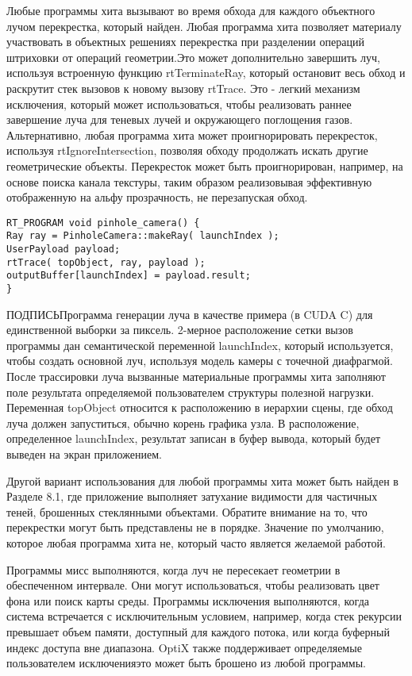 Любые программы хита вызывают во время обхода для каждого объектного лучом перекрестка, который найден. Любая программа хита позволяет материалу участвовать в объектных решениях перекрестка при разделении операций штриховки от операций геометрии.Это может дополнительно завершить луч, используя встроенную функцию rtTerminateRay, который остановит весь обход и раскрутит стек вызовов к новому вызову rtTrace. Это - легкий механизм исключения, который может использоваться, чтобы реализовать раннее завершение луча для теневых лучей и окружающего поглощения газов. Альтернативно, любая программа хита может проигнорировать перекресток, используя rtIgnoreIntersection, позволяя обходу продолжать искать другие геометрические объекты. Перекресток может быть проигнорирован, например, на основе поиска канала текстуры, таким образом реализовывая эффективную отображенную на альфу прозрачность, не перезапуская обход.
\begin{verbatim}
RT_PROGRAM void pinhole_camera() {
Ray ray = PinholeCamera::makeRay( launchIndex );
UserPayload payload;
rtTrace( topObject, ray, payload );
outputBuffer[launchIndex] = payload.result;
}
\end{verbatim}
ПОДПИСЬ{Программа генерации луча в качестве примера (в CUDA C) для единственной выборки за пиксель. 2-мерное расположение сетки вызов программы дан семантической переменной launchIndex, который используется, чтобы создать основной луч, используя модель камеры с точечной диафрагмой. После трассировки луча вызванные материальные программы хита заполняют поле результата определяемой пользователем структуры полезной нагрузки. Переменная topObject относится к расположению в иерархии сцены, где обход луча должен запуститься, обычно корень графика узла. В
расположение, определенное launchIndex, результат записан в буфер вывода, который будет выведен на экран приложением.}


  Другой вариант использования для любой программы хита может быть найден в Разделе 8.1, где приложение выполняет затухание видимости для частичных теней, брошенных стеклянными объектами. Обратите внимание на то, что перекрестки могут быть представлены не в порядке. Значение по умолчанию, которое любая программа хита не, который часто является желаемой работой.

  Программы мисс выполняются, когда луч не пересекает геометрии в обеспеченном интервале. Они могут использоваться, чтобы реализовать цвет фона или поиск карты среды. Программы исключения выполняются, когда система встречается с исключительным условием, например, когда стек рекурсии превышает объем памяти, доступный для каждого потока, или когда буферный индекс доступа вне диапазона. OptiX также поддерживает определяемые пользователем исключенияэто может быть брошено из любой программы. 
  
